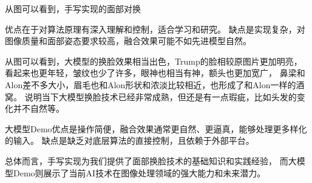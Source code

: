 
从图可以看到，手写实现的面部对换

优点在于对算法原理有深入理解和控制，适合学习和研究。
缺点是实现复杂，对图像质量和面部姿态要求较高，融合效果可能不如先进模型自然。


从图可以看到，大模型的换脸效果相当出色，Trump的脸相较原图片更加明亮，
看起来也更年轻，皱纹也少了许多，眼神也相当有神，额头也更加宽广，
鼻梁和Alon差不多大小，眉毛也和Alon形状和浓淡比较相近，也形成了和Alon一样的酒窝。
说明当下大模型换脸技术已经非常成熟，但还是有一点瑕疵，比如头发的变化并不自然等。

大模型Demo优点是操作简便，融合效果通常更自然、更逼真，能够处理更多样化的输入。
缺点是缺乏对底层算法的直接控制，且依赖于外部平台。

总体而言，手写实现为我们提供了面部换脸技术的基础知识和实践经验，
而大模型Demo则展示了当前AI技术在图像处理领域的强大能力和未来潜力。

